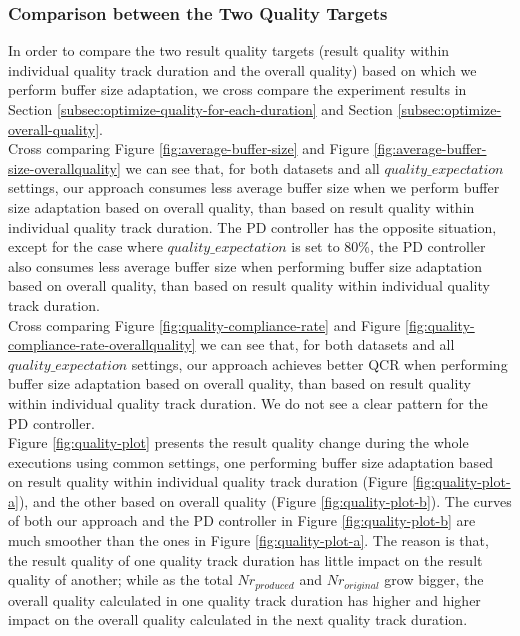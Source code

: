\documentclass[a4paper, 11pt, twoside]{report}
\begin{document}
\subsubsection{Comparison between the Two Quality Targets}

In order to compare the two result quality targets (result quality within individual quality track duration and the overall quality) based on which we perform buffer size adaptation, we cross compare the experiment results in Section \ref{subsec:optimize-quality-for-each-duration} and Section \ref{subsec:optimize-overall-quality}.\\

Cross comparing Figure \ref{fig:average-buffer-size} and Figure \ref{fig:average-buffer-size-overallquality} we can see that, for both datasets and all $quality\_expectation$ settings, our approach consumes less average buffer size when we perform buffer size adaptation based on overall quality, than based on result quality within individual quality track duration. The PD controller has the opposite situation, except for the case where $quality\_expectation$ is set to 80\%, the PD controller also consumes less average buffer size when performing buffer size adaptation based on overall quality, than based on result quality within individual quality track duration.\\

Cross comparing Figure \ref{fig:quality-compliance-rate} and Figure \ref{fig:quality-compliance-rate-overallquality} we can see that, for both datasets and all $quality\_expectation$ settings, our approach achieves better QCR when performing buffer size adaptation based on overall quality, than based on result quality within individual quality track duration. We do not see a clear pattern for the PD controller.\\

Figure \ref{fig:quality-plot} presents the result quality change during the whole executions using common settings, one performing buffer size adaptation based on result quality within individual quality track duration (Figure \ref{fig:quality-plot-a}), and the other based on overall quality (Figure \ref{fig:quality-plot-b}). The curves of both our approach and the PD controller in Figure \ref{fig:quality-plot-b} are much smoother than the ones in Figure \ref{fig:quality-plot-a}. The reason is that, the result quality of one quality track duration has little impact on the result quality of another; while as the total $Nr_{produced}$ and $Nr_{original}$ grow bigger, the overall quality calculated in one quality track duration has higher and higher impact on the overall quality calculated in the next quality track duration.\\
\end{document}
